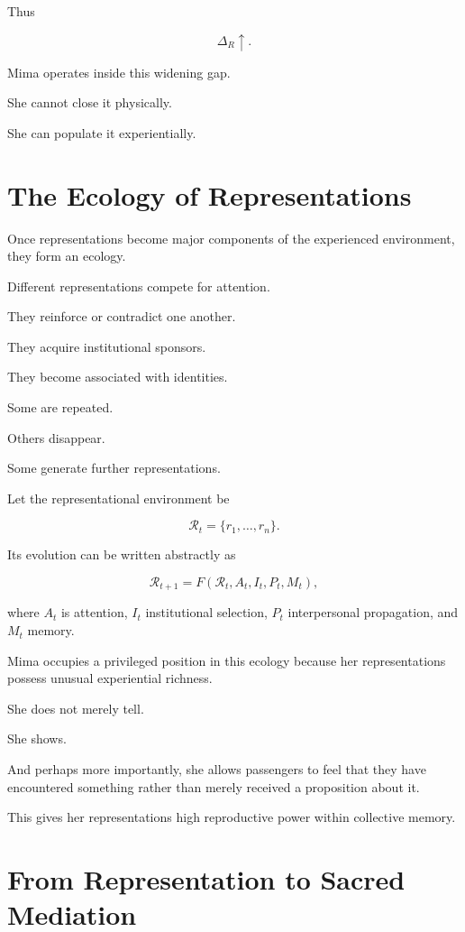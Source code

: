 \documentclass[11pt,oneside]{book}
\theoremstyle{definition}
\theoremstyle{remark}
\begin{document}
Thus

\[
\Delta_R\uparrow.
\]

Mima operates inside this widening gap.

She cannot close it physically.

She can populate it experientially.

\section{The Ecology of Representations}

Once representations become major components of the experienced environment, they form an ecology.

Different representations compete for attention.

They reinforce or contradict one another.

They acquire institutional sponsors.

They become associated with identities.

Some are repeated.

Others disappear.

Some generate further representations.

Let the representational environment be

\[
\mathcal R_t
=
\{r_1,\ldots,r_n\}.
\]

Its evolution can be written abstractly as

\[
\mathcal R_{t+1}
=
F(
\mathcal R_t,
A_t,
I_t,
P_t,
M_t
),
\]

where \(A_t\) is attention, \(I_t\) institutional selection, \(P_t\) interpersonal propagation, and \(M_t\) memory.

Mima occupies a privileged position in this ecology because her representations possess unusual experiential richness.

She does not merely tell.

She shows.

And perhaps more importantly, she allows passengers to feel that they have encountered something rather than merely received a proposition about it.

This gives her representations high reproductive power within collective memory.

\section{From Representation to Sacred Mediation}
\end{document}
